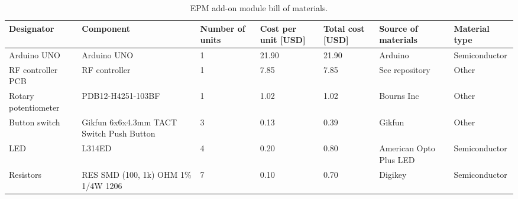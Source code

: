 \documentclass[11pt,letterpaper]{article}
\begin{document}
\begin{longtable}{ p{1.75cm} p{4cm} p{1.25cm} p{1cm} p{1cm} p{2cm} p{2.5cm} }	
	\caption{EPM add-on module bill of materials.} 
	\label{EPM_components} \\
	\toprule
	Designator & Component & Number of units & Cost per unit [USD] & Total cost [USD] & Source of materials & Material type \\
	\midrule
	Arduino UNO & Arduino UNO & 1 & 21.90 & 21.90 & Arduino & Semiconductor \\
	
	\rowcolor[gray]{0.925}
	RF controller PCB & RF controller & 1 & 7.85 & 7.85 & See repository & Other \\
	
	Rotary potentiometer & PDB12-H4251-103BF & 1 & 1.02 & 1.02 & Bourns Inc & Other \\
	
	\rowcolor[gray]{0.925}
	Button switch & Gikfun 6x6x4.3mm TACT Switch Push Button & 3 & 0.13 & 0.39 & Gikfun & Other \\
	
	LED & L314ED & 4 & 0.20 & 0.80 & American Opto Plus LED & Semiconductor \\ 
	
	\rowcolor[gray]{0.925}
	Resistors & RES SMD (100, 1k) OHM 1\% 1/4W 1206 & 7 & 0.10 & 0.70 & Digikey & Semiconductor \\

	\bottomrule
\end{longtable}
	
\end{document}

